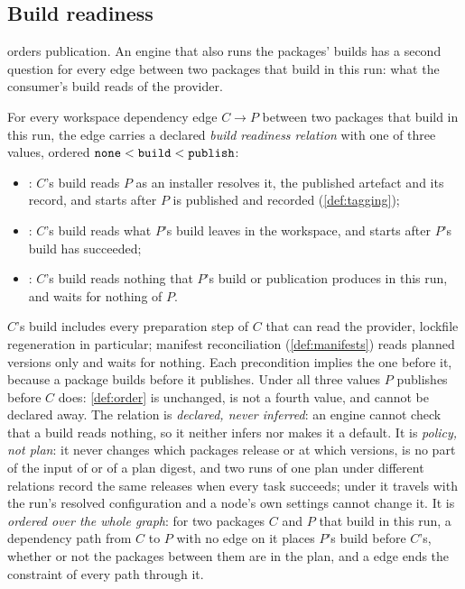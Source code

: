 \subsection{Build readiness}

 orders publication. An engine that also runs the packages'
builds has a second question for every edge between two packages that build
in this run: what the consumer's build reads of the provider.

\begin{definition}
\label{def:readiness}
For every workspace dependency edge $C \to P$ between two packages that build
in this run, the edge carries a declared \emph{build readiness relation} with
one of three values, ordered $\texttt{none} < \texttt{build} < \texttt{publish}$:
\begin{itemize}
  \item {}: $C$'s build reads $P$ as an installer resolves it, the
    published artefact and its record, and starts after $P$ is published and
    recorded (\cref{def:tagging});
  \item {}: $C$'s build reads what $P$'s build leaves in the
    workspace, and starts after $P$'s build has succeeded;
  \item {}: $C$'s build reads nothing that $P$'s build or publication
    produces in this run, and waits for nothing of $P$.
\end{itemize}
$C$'s build includes every preparation step of $C$ that can read the provider,
lockfile regeneration in particular; manifest reconciliation
(\cref{def:manifests}) reads planned versions only and waits for nothing. Each
precondition implies the one before it, because a package builds before it
publishes. Under all three values $P$ publishes before $C$ does:
\cref{def:order} is unchanged, is not a fourth value, and cannot be declared
away. The relation is \emph{declared, never inferred}: an engine cannot check
that a build reads nothing, so it neither infers  nor makes it a
default. It is \emph{policy, not plan}: it never changes which packages release
or at which versions, is no part of the input of  or of a plan
digest, and two runs of one plan under different relations record the same
releases when every task succeeds; under  it travels with the run's
resolved configuration and a node's own settings cannot change it. It is
\emph{ordered over the whole graph}: for two packages $C$ and $P$ that build
in this run, a dependency path from $C$ to $P$ with no  edge on it
places $P$'s build before $C$'s, whether or not the packages between them are
in the plan, and a  edge ends the constraint of every path through
it.
\end{definition}

